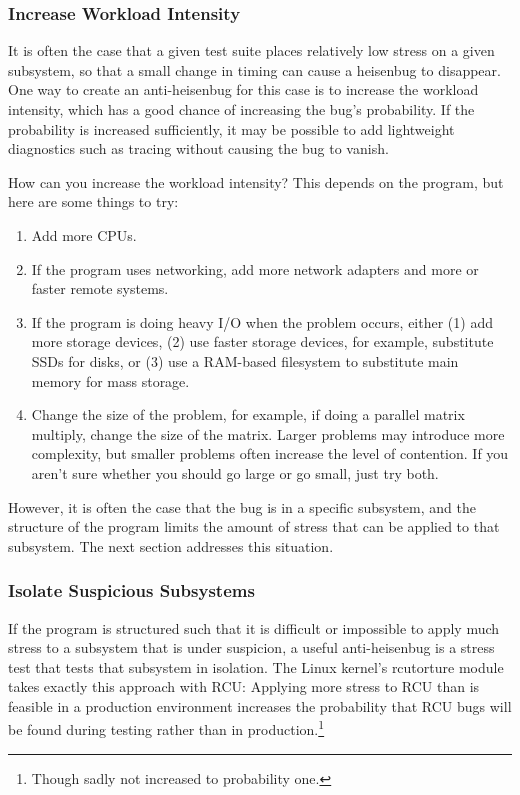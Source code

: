 \subsubsection{Increase Workload Intensity}
\label{sec:debugging:Increase Workload Intensity}

It is often the case that a given test suite places relatively
low stress on a given subsystem, so that a small change in timing
can cause a heisenbug to disappear.
One way to create an anti-heisenbug for this case is to increase
the workload intensity, which has a good chance of increasing the
bug's probability.
If the probability is increased sufficiently, it may be possible to
add lightweight diagnostics such as tracing without causing the
bug to vanish.

How can you increase the workload intensity?
This depends on the program, but here are some things to try:

\begin{enumerate}
\item	Add more CPUs.
\item	If the program uses networking, add more network adapters
	and more or faster remote systems.
\item	If the program is doing heavy I/O when the problem occurs,
	either (1) add more storage devices, (2) use faster storage
	devices, for example, substitute SSDs for disks,
	or (3) use a RAM-based filesystem to substitute main
	memory for mass storage.
\item	Change the size of the problem, for example, if doing a parallel
	matrix multiply, change the size of the matrix.
	Larger problems may introduce more complexity, but smaller
	problems often increase the level of contention.
	If you aren't sure whether you should go large or go small,
	just try both.
\end{enumerate}

However, it is often the case that the bug is in a specific subsystem,
and the structure of the program limits the amount of stress that can
be applied to that subsystem.
The next section addresses this situation.

\subsubsection{Isolate Suspicious Subsystems}
\label{sec:debugging:Isolate Suspicious Subsystems}

If the program is structured such that it is difficult or impossible
to apply much stress to a subsystem that is under suspicion,
a useful anti-heisenbug is a stress test that tests that subsystem in
isolation.
The Linux kernel's rcutorture module takes exactly this approach with RCU:
Applying more stress to RCU than is feasible in a production environment
increases the probability that RCU bugs will be found during testing
rather than in production.\footnote{
	Though sadly not increased to probability one.}

